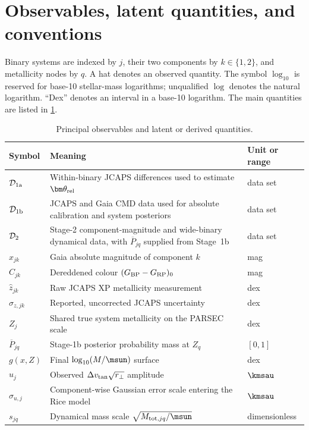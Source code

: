 \section{Observables, latent quantities, and conventions}
\label{sec:notation}

Binary systems are indexed by $j$, their two components by $k\in\{1,2\}$,
and metallicity nodes by $q$.  A hat denotes an observed quantity.  The symbol
$\log_{10}$ is reserved for base-10 stellar-mass logarithms; unqualified
$\log$ denotes the natural logarithm.  ``Dex'' denotes an interval in a
base-10 logarithm.  The main quantities are listed in \cref{tab:notation}.

\begin{table}[htbp]
\centering
\caption{Principal observables and latent or derived quantities.}
\label{tab:notation}
\begin{tabularx}{\textwidth}{@{}lXl@{}}
\toprule
Symbol & Meaning & Unit or range \\
\midrule
$\mathcal D_{\rm 1a}$ & Within-binary JCAPS differences used to estimate $\bm\theta_{\rm rel}$ & data set \\
$\mathcal D_{\rm 1b}$ & JCAPS and Gaia CMD data used for absolute calibration and system posteriors & data set \\
$\mathcal D_{\rm 2}$ & Stage-2 component-magnitude and wide-binary dynamical data, with $\overline P_{jq}$ supplied from Stage~1b & data set \\
$x_{jk}$ & Gaia absolute magnitude of component $k$ & mag \\
$C_{jk}$ & Dereddened colour $(G_{\rm BP}-G_{\rm RP})_0$ & mag \\
$\widehat z_{jk}$ & Raw JCAPS XP metallicity measurement & dex \\
$\sigma_{z,jk}$ & Reported, uncorrected JCAPS uncertainty & dex \\
$Z_j$ & Shared true system metallicity on the PARSEC scale & dex \\
$\overline P_{jq}$ & Stage-1b posterior probability mass at $Z_q$ & $[0,1]$ \\
$g(x,Z)$ & Final $\log_{10}(M/\msun)$ surface & dex \\
$u_j$ & Observed $\Delta v_{\rm tan}\sqrt{r_\perp}$ amplitude & $\kmsau$ \\
$\sigma_{u,j}$ & Component-wise Gaussian error scale entering the Rice model & $\kmsau$ \\
$s_{jq}$ & Dynamical mass scale $\sqrt{M_{{\rm tot},jq}/\msun}$ & dimensionless \\
\bottomrule
\end{tabularx}
\end{table}
\FloatBarrier

